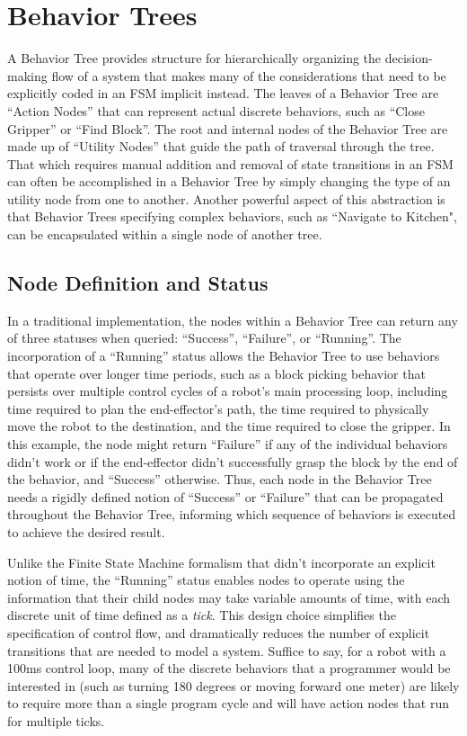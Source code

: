 \section{Behavior Trees}\label{sec:behaviortrees}
A Behavior Tree \cite{colledanchise2018behavior} provides structure for hierarchically organizing the decision-making flow of a system that makes many of the considerations that need to be explicitly coded in an FSM implicit instead. The leaves of a Behavior Tree are ``Action Nodes'' that can represent actual discrete behaviors, such as ``Close Gripper'' or ``Find Block''. The root and internal nodes of the Behavior Tree are made up of ``Utility Nodes'' that guide the path of traversal through the tree. That which requires manual addition and removal of state transitions in an FSM can often be accomplished in a Behavior Tree by simply changing the type of an utility node from one to another. Another powerful aspect of this abstraction is that Behavior Trees specifying complex behaviors, such as ``Navigate to Kitchen", can be encapsulated within a single node of another tree.

\subsection{Node Definition and Status}
In a traditional implementation, the nodes within a Behavior Tree can return any of three statuses when queried: ``Success'', ``Failure'', or ``Running''. The incorporation of a ``Running'' status allows the Behavior Tree to use behaviors that operate over longer time periods, such as a block picking behavior that persists over multiple control cycles of a robot's main processing loop, including time required to plan the end-effector's path, the time required to physically move the robot to the destination, and the time required to close the gripper. In this example, the node might return ``Failure'' if any of the individual behaviors didn't work or if the end-effector didn't successfully grasp the block by the end of the behavior, and ``Success'' otherwise. Thus, each node in the Behavior Tree needs a rigidly defined notion of ``Success'' or ``Failure'' that can be propagated throughout the Behavior Tree, informing which sequence of behaviors is executed to achieve the desired result.

Unlike the Finite State Machine formalism that didn't incorporate an explicit notion of time, the ``Running'' status enables nodes to operate using the information that their child nodes may take variable amounts of time, with each discrete unit of time defined as a \textsl{tick}. This design choice simplifies the specification of control flow, and dramatically reduces the number of explicit transitions that are needed to model a system. Suffice to say, for a robot with a 100ms control loop, many of the discrete behaviors that a programmer would be interested in (such as turning 180 degrees or moving forward one meter) are likely to require more than a single program cycle and will have action nodes that run for multiple ticks.

